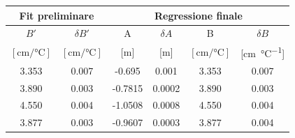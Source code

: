 \begin{center}
    \begin{tabular}{c c | c c c c}
        \toprule
        \multicolumn{2}{c|}{Fit preliminare} & \multicolumn{4}{c}{Regressione finale} \\
        \midrule
        $B'$ & $\delta B'$ & A & $\delta A$ & B & $\delta B$ \\
        $[\si{\centi\meter\per\celsius}]$ & $[\si{\centi\meter\per\celsius}]$ &
        [m] & [m] & $[\si{\centi\meter\per\celsius}]$ & [\si{\centi\metre\per\celsius}] \\
        \midrule
        3.353 & 0.007 & -0.695  & 0.001 & 3.353 & 0.007 \\
        3.890 & 0.003 & -0.7815 & 0.0002 & 3.890 & 0.003 \\
        4.550 & 0.004 & -1.0508 & 0.0008 & 4.550 & 0.004 \\
        3.877 & 0.003 & -0.9607 & 0.0003 & 3.877 & 0.004 \\
        \bottomrule
    \end{tabular}
\end{center}
